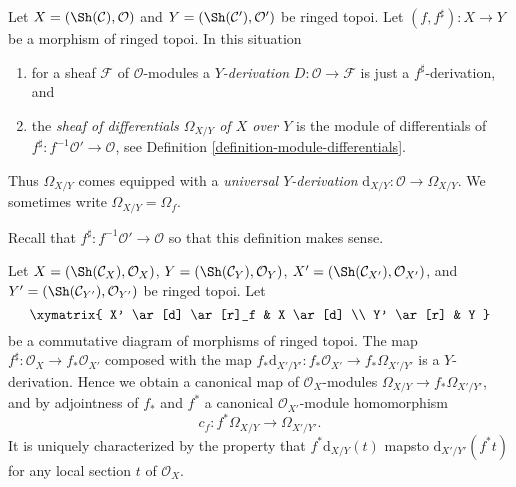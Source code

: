 \begin{definition}
\label{definition-sheaf-differentials}
Let $X = (\Sh(\mathcal{C}), \mathcal{O})$ and
$Y = (\Sh(\mathcal{C}'), \mathcal{O}')$ be ringed topoi.
Let $(f, f^\sharp) : X \to Y$ be a morphism of ringed topoi.
In this situation
\begin{enumerate}
\item for a sheaf $\mathcal{F}$ of $\mathcal{O}$-modules a
{\it $Y$-derivation} $D : \mathcal{O} \to \mathcal{F}$ is just a
$f^\sharp$-derivation, and
\item the {\it sheaf of differentials $\Omega_{X/Y}$ of $X$ over $Y$}
is the module of differentials of
$f^\sharp : f^{-1}\mathcal{O}' \to \mathcal{O}$,
see Definition \ref{definition-module-differentials}.
\end{enumerate}
Thus $\Omega_{X/Y}$ comes equipped with a {\it universal $Y$-derivation}
$\text{d}_{X/Y} : \mathcal{O} \longrightarrow \Omega_{X/Y}$. We sometimes
write $\Omega_{X/Y} = \Omega_f$.
\end{definition}

\noindent
Recall that $f^\sharp : f^{-1}\mathcal{O}' \to \mathcal{O}$ so that
this definition makes sense.

\begin{lemma}
\label{lemma-functoriality-differentials-ringed-topoi}
Let
$X = (\Sh(\mathcal{C}_X), \mathcal{O}_X)$,
$Y = (\Sh(\mathcal{C}_Y), \mathcal{O}_Y)$,
$X' = (\Sh(\mathcal{C}_{X'}), \mathcal{O}_{X'})$, and
$Y' = (\Sh(\mathcal{C}_{Y'}), \mathcal{O}_{Y'})$ be ringed topoi.
Let
$$
\xymatrix{
X' \ar[d] \ar[r]_f & X \ar[d] \\
Y' \ar[r] & Y
}
$$
be a commutative diagram of morphisms of ringed topoi. The map
$f^\sharp : \mathcal{O}_X \to f_*\mathcal{O}_{X'}$ composed with the map
$f_*\text{d}_{X'/Y'} : f_*\mathcal{O}_{X'} \to f_*\Omega_{X'/Y'}$ is a
$Y$-derivation. Hence we obtain a canonical map of $\mathcal{O}_X$-modules
$\Omega_{X/Y} \to f_*\Omega_{X'/Y'}$, and by
adjointness of $f_*$ and $f^*$ a
canonical $\mathcal{O}_{X'}$-module homomorphism
$$
c_f : f^*\Omega_{X/Y} \longrightarrow \Omega_{X'/Y'}.
$$
It is uniquely characterized by the property that
$f^*\text{d}_{X/Y}(t)$ mapsto $\text{d}_{X'/Y'}(f^* t)$
for any local section $t$ of $\mathcal{O}_X$.
\end{lemma}

